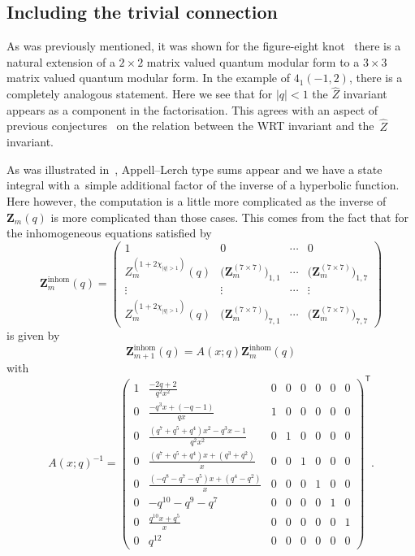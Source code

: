 \documentclass[pdftex]{sigma}
\numberwithin{equation}{section}
\begin{document}
\subsection{Including the trivial connection}\label{sec:triv.statint}

As was previously mentioned, it was shown for the figure-eight knot~\cite{GGMW,Wh:thesis} there is a natural extension of a $2\times 2$ matrix valued quantum modular form to a $3\times 3$ matrix valued quantum modular form. In the example of $4_1(-1,2)$, there is a completely analogous statement. Here we see that for $|q|<1$ the $\widehat{Z}$ invariant appears as a component in the factorisation. This agrees with an aspect of previous conjectures~\cite{GukovMan} on the relation between the WRT invariant and the~$\widehat{Z}$ invariant.

As was illustrated in~\cite{GGMW}, Appell--Lerch type sums appear and we have a state integral with a~simple additional factor of the inverse of a hyperbolic function. Here however, the computation is a little more complicated as the inverse of $\mathbf{Z}_m(q)$ is more complicated than those cases. This comes from the fact that for the inhomogeneous equations satisfied by
\[
 \mathbf{Z}^{\mathrm{inhom}}_{m}(q)
  =
 \begin{pmatrix}
 1 & 0 & \cdots & 0\\
 Z^{(1+2\chi_{|q|>1})}_{m}(q) & \bigl(\mathbf{Z}_{m}^{(7\times 7)}\bigr)_{1,1} & \cdots & \bigl(\mathbf{Z}_{m}^{(7\times 7)}\bigr)_{1,7}\\
 \vdots & \vdots & \cdots & \vdots\\
 Z^{(1+2\chi_{|q|>1})}_{m}(q) & \bigl(\mathbf{Z}_{m}^{(7\times 7)}\bigr)_{7,1} & \cdots & \bigl(\mathbf{Z}_{m}^{(7\times 7)}\bigr)_{7,7}
 \end{pmatrix}
\]
is given by
\[
 \mathbf{Z}^{\mathrm{inhom}}_{m+1}(q)
  =
 A(x;q)\mathbf{Z}^{\mathrm{inhom}}_{m}(q)
\]
with
\[
 A(x;q)^{-1}
  =\begin{pmatrix}
 1&\frac{-2q + 2}{q^2x^2}&0&0&0&0&0&0\\[1mm]
 0&\frac{-q^3x + (-q - 1)}{qx}&1&0&0&0&0&0\\[1mm]
 0&\frac{(q^7 + q^5 + q^4)x^2 - q^3x - 1}{q^2x^2}&0&1&0&0&0&0\\[1mm]
 0&\frac{(q^7 + q^5 + q^4)x + (q^3 + q^2)}{x}&0&0&1&0&0&0\\[1mm]
 0&\frac{(-q^8 - q^7 - q^5)x + (q^4 - q^2)}{x}&0&0&0&1&0&0\\[1mm]
 0&-q^{10} - q^9 - q^7&0&0&0&0&1&0\\[1mm]
 0&\frac{q^{10}x + q^5}{x}&0&0&0&0&0&1\\[1mm]
 0&q^{12}&0&0&0&0&0&0
\end{pmatrix}^{\mathsf{T}}.
\]
\end{document}
